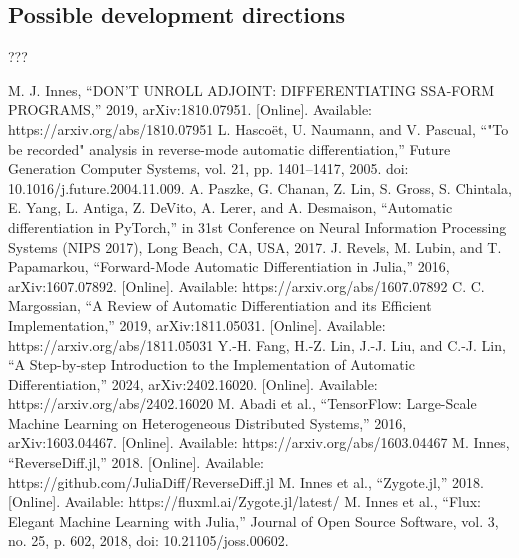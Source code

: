 \documentclass[conference]{IEEEtran}
\begin{document}
\subsection{Possible development directions}
???

\begin{thebibliography}{00}
 M. J. Innes, ``DON'T UNROLL ADJOINT: DIFFERENTIATING SSA-FORM PROGRAMS,'' 2019, arXiv:1810.07951. [Online]. Available: https://arxiv.org/abs/1810.07951
 L. Hascoët, U. Naumann, and V. Pascual, ``"To be recorded" analysis in reverse-mode automatic differentiation,'' Future Generation Computer Systems, vol. 21, pp. 1401--1417, 2005. doi: 10.1016/j.future.2004.11.009.
 A. Paszke, G. Chanan, Z. Lin, S. Gross, S. Chintala, E. Yang, L. Antiga, Z. DeVito, A. Lerer, and A. Desmaison, ``Automatic differentiation in PyTorch,'' in 31st Conference on Neural Information Processing Systems (NIPS 2017), Long Beach, CA, USA, 2017.
 J. Revels, M. Lubin, and T. Papamarkou, ``Forward-Mode Automatic Differentiation in Julia,'' 2016, arXiv:1607.07892. [Online]. Available: https://arxiv.org/abs/1607.07892
 C. C. Margossian, ``A Review of Automatic Differentiation and its Efficient Implementation,'' 2019, arXiv:1811.05031. [Online]. Available: https://arxiv.org/abs/1811.05031
 Y.-H. Fang, H.-Z. Lin, J.-J. Liu, and C.-J. Lin, ``A Step-by-step Introduction to the Implementation of Automatic Differentiation,'' 2024, arXiv:2402.16020. [Online]. Available: https://arxiv.org/abs/2402.16020
 M. Abadi et al., ``TensorFlow: Large-Scale Machine Learning on Heterogeneous Distributed Systems,'' 2016, arXiv:1603.04467. [Online]. Available: https://arxiv.org/abs/1603.04467
 M. Innes, ``ReverseDiff.jl,'' 2018. [Online]. Available: https://github.com/JuliaDiff/ReverseDiff.jl
 M. Innes et al., ``Zygote.jl,'' 2018. [Online]. Available: https://fluxml.ai/Zygote.jl/latest/
 M. Innes et al., ``Flux: Elegant Machine Learning with Julia,'' Journal of Open Source Software, vol. 3, no. 25, p. 602, 2018, doi: 10.21105/joss.00602.
\end{thebibliography}
\end{document}
